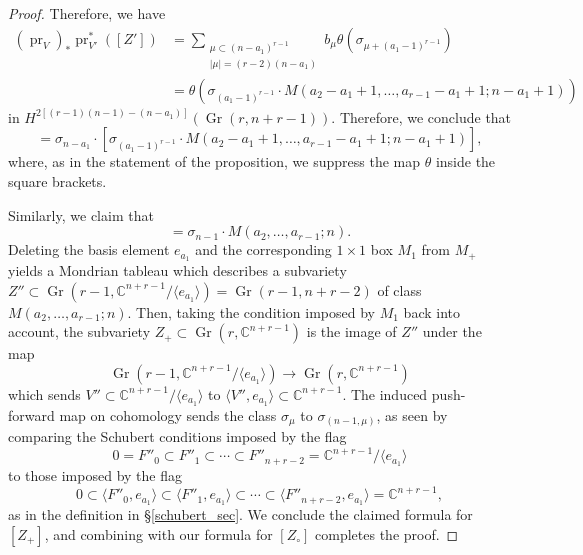 \documentclass[11pt]{article}
\theoremstyle{definition}
\numberwithin{equation}{section}
\newcommand{\bC}{\mathbb{C}}
\DeclareMathOperator{\Gr}{Gr}
\DeclareMathOperator{\pr}{pr}
\begin{document}
\begin{proof}
Therefore, we have
\begin{align*}
(\pr_V)_{*}\pr_{V'}^{*}([Z'])&=\sum_{\substack{\mu\subset(n-a_1)^{r-1} \\ |\mu|=(r-2)(n-a_1)}} b_\mu\theta(\sigma_{\mu+(a_1-1)^{r-1}})\\
&=\theta(\sigma_{(a_1-1)^{r-1}}\cdot M(a_2-a_1+1,\ldots,a_{r-1}-a_1+1;n-a_1+1))
\end{align*}
in $H^{2[(r-1)(n-1)-(n-a_1)]}(\Gr(r,n+r-1))$. Therefore, we conclude that
\begin{equation*}
[Z_\circ]=\sigma_{n-a_1}\cdot [\sigma_{(a_1-1)^{r-1}}\cdot M(a_2-a_1+1,\ldots,a_{r-1}-a_1+1;n-a_1+1)],
\end{equation*}
where, as in the statement of the proposition, we suppress the map $\theta$ inside the square brackets.

Similarly, we claim that
\begin{equation*}
[Z_+]=\sigma_{n-1}\cdot M(a_2,\ldots,a_{r-1};n).
\end{equation*}
Deleting the basis element $e_{a_1}$ and the corresponding $1\times1$ box $M_1$ from $M_+$ yields a Mondrian tableau which describes a subvariety $Z''\subset\Gr(r-1,\bC^{n+r-1}/\langle e_{a_1}\rangle)=\Gr(r-1,n+r-2)$ of class $M(a_2,\ldots,a_{r-1};n)$. Then, taking the condition imposed by $M_1$ back into account, the subvariety $Z_+\subset\Gr(r,\bC^{n+r-1})$ is the image of $Z''$ under the map
\begin{equation*}
\Gr(r-1,\bC^{n+r-1}/\langle e_{a_1}\rangle)\to\Gr(r,\bC^{n+r-1})
\end{equation*}
which sends $V''\subset \bC^{n+r-1}/\langle e_{a_1}\rangle$ to $\langle V'',e_{a_1}\rangle\subset \bC^{n+r-1}$. The induced push-forward map on cohomology sends the class $\sigma_{\mu}$ to $\sigma_{(n-1,\mu)}$, as seen by comparing the Schubert conditions imposed by the flag 
\begin{equation*}
0= F''_0\subset F''_1\subset\cdots\subset F''_{n+r-2}=\bC^{n+r-1}/\langle e_{a_1}\rangle
\end{equation*}
to those imposed by the flag 
\begin{equation*}
0\subset \langle F''_0,e_{a_1}\rangle\subset \langle F''_1,e_{a_1}\rangle\subset\cdots\subset \langle F''_{n+r-2},e_{a_1}\rangle=\bC^{n+r-1},
\end{equation*}
as in the definition in \S\ref{schubert_sec}. We conclude the claimed formula for $[Z_+]$, and combining with our formula for $[Z_\circ]$ completes the proof.
\end{proof}
\end{document}
